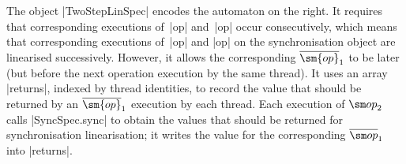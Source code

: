 The object |TwoStepLinSpec| encodes the automaton on the right.  It requires
that corresponding executions of~|op| and~|op| occur consecutively,
which means that corresponding executions of~|op| and |op| on the
synchronisation object are linearised successively.  However, it
allows the corresponding $\overline{\sm{op}}_1$ to be later (but before the
next operation execution by the same thread).  It uses an array |returns|,
indexed by thread identities, to record the value that should be returned by
an $\overline{\sm{op}}_1$ execution by each thread.  Each execution of
$\op_2$ calls |SyncSpec.sync| to obtain the values that should be returned for
synchronisation linearisation; it writes the value for the corresponding
$\overline\op_1$ into |returns|.
\end{window}

